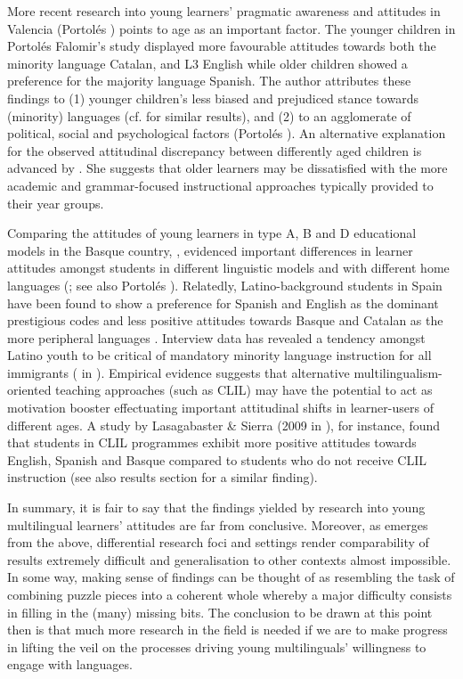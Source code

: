 \documentclass[output=paper]{../langscibook}
\begin{document}
More recent research into young learners’ pragmatic awareness and attitudes in Valencia (Portolés \citealt[172]{Falomir2015}) points to age as an important factor. The younger children in Portolés Falomir’s study displayed more favourable attitudes towards both the minority language Catalan, and L3 English while older children showed a preference for the majority language Spanish. The author attributes these findings to (1) younger children’s less biased and prejudiced stance towards (minority) languages (cf. \citealt[213]{Cenoz2004} for similar results), and (2) to an agglomerate of political, social and psychological factors (Portolés \citealt[172]{Falomir2015}). An alternative explanation for the observed attitudinal discrepancy between differently aged children is advanced by \citet[214]{Cenoz2004}. She suggests that older learners may be dissatisfied with the more academic and grammar-focused instructional approaches typically provided to their year groups. 

Comparing the attitudes of young learners in type A, B and D educational models in the Basque country, \citet{Lasagabaster2005}, evidenced important differences in learner attitudes amongst students in different linguistic models and with different home languages (\citealt[585]{Lasagabaster2017}; see also Portolés \citealt[172]{Falomir2015}). Relatedly, Latino-background students in Spain have been found to show a preference for Spanish and English as the dominant prestigious codes and less positive attitudes towards Basque and Catalan as the more peripheral languages \citep[589]{Lasagabaster2017}. Interview data has revealed a tendency amongst Latino youth to be critical of mandatory minority language instruction for all immigrants (\citealt{LaprestaEtAl2010} in \citealt[589]{Lasagabaster2017}). Empirical evidence suggests that alternative multilingualism-oriented teaching approaches (such as CLIL) may have the potential to act as motivation booster effectuating important attitudinal shifts in learner-users of different ages. A study by Lasagabaster \& Sierra (2009 in \citealt[590]{Lasagabaster2017}), for instance, found that students in CLIL programmes exhibit more positive attitudes towards English, Spanish and Basque compared to students who do not receive CLIL instruction (see also results section for a similar finding).

In summary, it is fair to say that the findings yielded by research into young multilingual learners’ attitudes are far from conclusive. Moreover, as emerges from the above, differential research foci and settings render comparability of results extremely difficult and generalisation to other contexts almost impossible. In some way, making sense of findings can be thought of as resembling the task of combining puzzle pieces into a coherent whole whereby a major difficulty consists in filling in the (many) missing bits. The conclusion to be drawn at this point then is that much more research in the field is needed if we are to make progress in lifting the veil on the processes driving young multilinguals’ willingness to engage with languages.   
\end{document}
